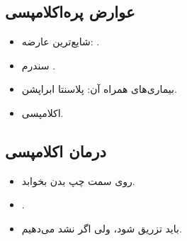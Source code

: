 \documentclass[12pt,a4paper]{article}
\begin{document}
\subsection*{عوارض پره‌اکلامپسی}
\begin{itemize}
\item شایع‌ترین عارضه: .
\item سندرم .
\item بیماری‌های همراه آن: پلاسنتا ابراپشن.
\item اکلامپسی.
\end{itemize}
\subsection*{درمان اکلامپسی}
\begin{itemize}
\item روی سمت چپ بدن بخوابد.
\item {} .
\item {} باید  تزریق شود، ولی اگر نشد  می‌دهیم.
\end{itemize}

\clearpage
\end{document}
